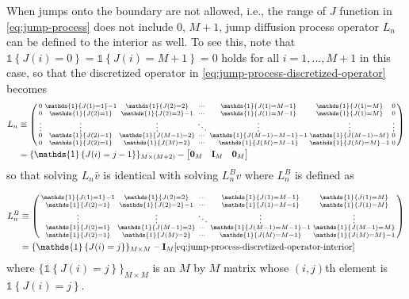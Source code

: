 \documentclass[11pt]{article}
\newcommand{\indicator}[1]{\ensuremath{\mathds{1}\left\{{#1}\right\}}}
\newenvironment{psmallmatrix}
{\left(\begin{smallmatrix}}
	{\end{smallmatrix}\right)}
\theoremstyle{definition}
\begin{document}
When jumps onto the boundary are not allowed, i.e., the range of $J$ function in \eqref{eq:jump-process} does not include $0$, $M+1$,  jump diffusion process operator $L_n$ can be defined to the interior as well. To see this, note that $\indicator{J(i) = 0} = \indicator{J(i) = M+1} = 0$ holds for all $i = 1,..., M+1$ in this case, so that the discretized operator in \eqref{eq:jump-process-discretized-operator} becomes
\begin{align}
L_n &\equiv \begin{psmallmatrix}
0 & \indicator{J(1) = 1} -1 & \indicator{J(2) = 2} & \cdots & \indicator{J(1) = M-1} & \indicator{J(1) = M} & 0 \\
0 & \indicator{J(2) = 1}  & \indicator{J(2) = 2} - 1 & \cdots & \indicator{J(1) = M-1}  & \indicator{J(1) = M} & 0 \\
\vdots & \vdots & \vdots & \ddots & \vdots & \vdots &\vdots \\
0 & \indicator{J(2) = 1}  & \indicator{J(M-1) = 2} & \cdots & \indicator{J(M-1) = M-1} - 1 & \indicator{J(M-1) = M} &0 \\
0 & \indicator{J(2) = 1}  & \indicator{J(M) = 2} & \cdots & \indicator{J(M) = M-1}  & \indicator{J(M) = M} - 1&0
\end{psmallmatrix}
\\
&= \{ \indicator{ J(i) = j-1 } \}_{M \times (M+2)} - \begin{bmatrix} \mathbf{0}_M &\mathbf{I}_M & \mathbf{0}_M  \end{bmatrix}
\end{align}
so that solving $L_n \overline{v} $ is identical with solving $L_n^B v$ where $L_n^B$ is defined as

\begin{align}
L_n^B &\equiv \begin{psmallmatrix}
\indicator{J(1) = 1} -1 & \indicator{J(2) = 2} & \cdots & \indicator{J(1) = M-1} & \indicator{J(1) = M}  \\
 \indicator{J(2) = 1}  & \indicator{J(2) = 2} - 1 & \cdots & \indicator{J(1) = M-1}  & \indicator{J(1) = M}  \\
\vdots & \vdots & \ddots & \vdots & \vdots \\
\indicator{J(2) = 1}  & \indicator{J(M-1) = 2} & \cdots & \indicator{J(M-1) = M-1} - 1 & \indicator{J(M-1) = M}  \\
\indicator{J(2) = 1}  & \indicator{J(M) = 2} & \cdots & \indicator{J(M) = M-1}  & \indicator{J(M) = M} - 1
\end{psmallmatrix}
\\
&= \{ \indicator{ J(i) = j } \}_{M \times M} - \mathbf{I}_M \eqref{eq:jump-process-discretized-operator-interior}
\end{align}
where $\{ \indicator{ J(i) = j } \}_{M \times M} $ is an $M$ by $M$ matrix whose $(i,j)$th element is $ \indicator{ J(i) = j } $.
\end{document}
